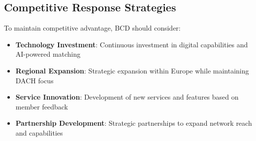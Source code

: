 \subsection{Competitive Response Strategies}

To maintain competitive advantage, BCD should consider:

\begin{itemize}
    \item \textbf{Technology Investment}: Continuous investment in digital capabilities and AI-powered matching
    \item \textbf{Regional Expansion}: Strategic expansion within Europe while maintaining DACH focus
    \item \textbf{Service Innovation}: Development of new services and features based on member feedback
    \item \textbf{Partnership Development}: Strategic partnerships to expand network reach and capabilities
\end{itemize}

